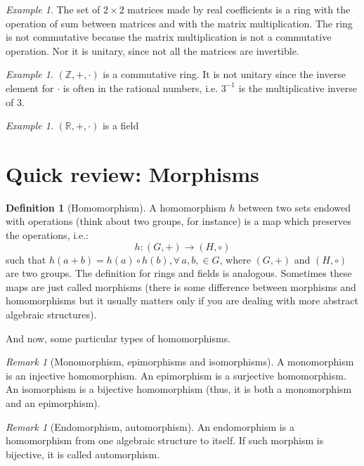 \documentclass[a4paper,11pt,titlepage]{article}
\numberwithin{equation}{section}
\theoremstyle{definition}
\newtheorem{definition}[theorem]{Definition}
\theoremstyle{remark}
\newtheorem{remark}[theorem]{Remark}
\newtheorem{example}[theorem]{Example}
\begin{document}
\begin{example}
The set of $2 \times 2$ matrices made by real coefficients is a ring with the operation of sum between matrices and with the matrix multiplication. The ring is not commutative because the matrix multiplication is not a commutative operation. Nor it is unitary, since not all the matrices are invertible.
\end{example}

\begin{example}
$(\mathbb{Z}, +, \cdot)$ is a commutative ring. It is not unitary since the inverse element for $\cdot$ is often in the rational numbers, i.e. $3^{-1}$ is the multiplicative inverse of $3$.
\end{example}

\begin{example}
$(\mathbb{R}, +, \cdot)$ is a field
\end{example}
\newpage

\section{Quick review: Morphisms}
\begin{definition}[Homomorphism]
A homomorphism $h$ between two sets endowed with operations (think about two groups, for instance) is a map which preserves the operations, i.e.:
\begin{equation*}
h \colon (G, +) \longrightarrow (H, \circ)
\end{equation*}
such that $h(a + b) = h(a) \circ h(b), \forall\, a, b, \in G$, where $(G, +)$ and $(H, \circ)$ are two groups. The definition for rings and fields is analogous. Sometimes these maps are just called morphisms (there is some difference between morphisms and homomorphisms but it usually matters only if you are dealing with more abstract algebraic structures).
\end{definition}

And now, some particular types of homomorphisms.

\begin{remark} [Monomorphism, epimorphisms and isomorphisms]
A monomorphism is an injective homomorphism. An epimorphism is a surjective homomorphism. An isomorphism is a bijective homomorphism (thus, it is both a monomorphism and an epimorphism).
\end{remark}

\begin{remark} [Endomorphism, automorphism]
An endomorphism is a homomorphism from one algebraic structure to itself. If such morphism is bijective, it is called automorphism.
\end{remark}
\end{document}

